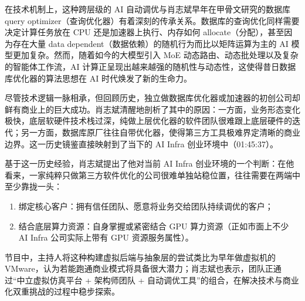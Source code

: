 \documentclass[UTF8,a4paper,11pt,fontset=fandol]{ctexart}
\begin{document}
在技术机制上，这种跨层级的 AI 自动调优与肖志斌早年在甲骨文研究的数据库 query optimizer（查询优化器）有着深刻的传承关系。数据库的查询优化同样需要决定计算任务放在 CPU 还是加速器上执行、内存如何 allocate（分配），甚至因为存在大量 data dependent（数据依赖）的随机行为而比以矩阵运算为主的 AI 模型更加复杂。然而，随着如今的大模型引入 MoE 动态路由、动态批处理以及复杂的智能体工作流，AI 计算正呈现出越来越强的随机性与动态性，这使得昔日数据库优化器的算法思想在 AI 时代焕发了新的生命力。

尽管技术逻辑一脉相承，但回顾历史，独立做数据库优化器或加速器的初创公司却鲜有商业上的巨大成功。肖志斌清醒地剖析了其中的原因：一方面，业务形态变化极快，底层软硬件技术栈过深，纯做上层优化器的软件团队很难跟上底层硬件的迭代；另一方面，数据库原厂往往自带优化器，使得第三方工具极难界定清晰的商业边界。这一历史镜鉴直接映射到了当下的 AI Infra 创业环境中（01:45:37）。

基于这一历史经验，肖志斌提出了他对当前 AI Infra 创业环境的一个判断：在他看来，一家纯粹只做第三方软件优化的公司很难单独站稳位置，往往需要在两端中至少靠拢一头：
\begin{enumerate}
\item 绑定核心客户：拥有信任团队、愿意将业务交给团队持续调优的客户；
\item 结合底层算力资源：自身掌握或紧密结合 GPU 算力资源（正如市面上不少 AI Infra 公司实际上带有 GPU 资源服务属性）。
\end{enumerate}
节目中，主持人将这种构建虚拟后端与抽象层的尝试类比为早年做虚拟机的 VMware，认为若能跑通商业模式将具备很大潜力；肖志斌也表示，团队正通过“中立虚拟仿真平台 + 架构师团队 + 自动调优工具”的组合，在解决技术与商业化双重挑战的过程中稳步探索。
\end{document}
